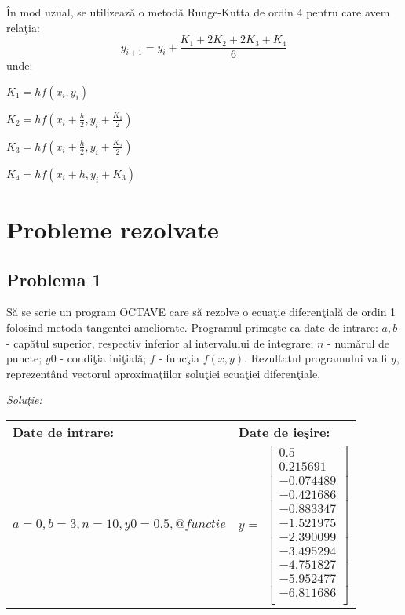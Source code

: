 \documentclass{exam}
\newcommand{\octavescript}[2]{
	
}
\begin{document}
În mod uzual, se utilizează o metodă Runge-Kutta de ordin $4$ pentru care avem relaţia: \\
$$y_{i+1} = y_i + \frac{K_1+2K_2+2K_3+K_4}{6}$$
\noindent  unde:

$K_1 = hf(x_i,y_i) $

$K_2 = hf(x_i+\frac{h}{2}, y_i+\frac{K_1}{2})$

$K_3 = hf(x_i+\frac{h}{2}, y_i+\frac{K_2}{2})$

$K_4 = hf(x_i+h, y_i+K_3)$




\section{Probleme rezolvate}
\subsection{Problema 1}

Să se scrie un program OCTAVE care să rezolve o ecuaţie diferenţială de ordin 1 folosind metoda tangentei ameliorate. Programul primeşte ca date de intrare: $a, b$ - capătul superior, respectiv inferior al intervalului de integrare; $n$ - numărul de puncte;  $y0$ - condiţia iniţială; $f$ - funcţia $f(x,y)$. Rezultatul programului va fi $y$, reprezentând vectorul aproximaţiilor soluţiei ecuaţiei diferenţiale.

\textit{Soluţie:}

\octavescript{./src/tangenta_ameliorata.m}{Metoda tangentei ameliorate.}

\begin{center}
	\begin{tabular}{| l | l |}
		\hline
		\textbf{Date de intrare:}                   & \textbf{Date de ieşire:} \\
		$a = 0, b = 3, n = 10, y0 = 0.5,  @functie$ &
		$y = $
		$
			\begin{bmatrix}
				0.5       \\
				0.215691  \\
				-0.074489 \\
				-0.421686 \\
				-0.883347 \\
				-1.521975 \\
				-2.390099 \\
				-3.495294 \\
				-4.751827 \\
				-5.952477 \\
				-6.811686 \\
			\end{bmatrix}
		$
		\\
		\hline
	\end{tabular}
\end{center}
\end{document}
